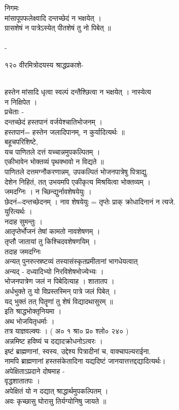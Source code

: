 \documentclass[11pt, openany]{book}
\begin{document}
{{{{{{{निगमः\\
मांसापूपफलेक्ष्वादि दन्तच्छेदं न भक्षयेत् ।\\
ग्रासशेषं न पात्रेऽस्येत् पीतशेषं तु नो पिबेत् ॥\\
~\\
-

{१२० }{ वीरमित्रोदयस्य श्राद्धप्रकाशे-}{\\
हस्तेन मांसादि धृत्वा स्वल्पं दन्तैश्छित्वा न भक्षयेत् । नास्येत्य\\
न निक्षिपेत ।\\
प्रचेताः -\\
दन्तच्छेदं हस्तपानं वर्जयेश्चातिभोजनम् ।\\
हस्तपानं= हस्तेन जलादिपानम्, न कुर्यादित्यर्थः ॥\\
बहूचपरिशिष्टे,\\
यच पाणितले दत्तं यच्चान्नमुपकल्पितम् ।\\
एकीभावेन भोक्तव्यं पृथक्भावो न विद्यते ॥\\
पाणितले दत्तमग्नौकरणान्नम्, उपकल्पितं भोजनपात्रेषु पित्राद्यु.\\
देशेन निहितं, तत् उभयमपि एकीकृत्य मिश्रयित्वा भोक्तव्यम् ।\\
जमदग्निः । न च्छिन्द्युर्नावशेषयेयुः ।\\
छेदनं=दन्तच्छेदनम् । नाव शेषयेयुः = तृप्तेः प्राक् क्रोधादिनानं न
त्यजे.\\
युरित्यर्थः ।\\
नदाह सुमन्तुः ।\\
आतृप्तेर्भोजनं तेषां कामतो नावशेषणम् ।\\
तृप्तौ जातायां तु किश्चिदवशेषणयिम् ।\\
तदाह जमदग्निः \textbar{}\\
अन्यत् पुनरुत्स्रष्टव्यं तस्यासंस्कृतप्रमीतानां भागधेयत्वात्\\
अन्यद् - दध्यादिभ्यो निरविशेषभोज्येभ्यः ।\\
भोजनपात्रेण जलं न पिबेदित्याह । शातातप ।\\
अर्धभुक्ते तु यो विप्रस्तस्मिन् पात्रे जलं पिबेत् ।\\
यद् भुक्तं तत् पितॄणां तु शेषं विद्यादथासुरम् ॥\\
इति श्राद्धभोक्तृनियमा ।\\
अथ भोजयितृधर्माः ।\\
तत्र याज्ञवल्क्यः । ( अ० १ श्रा० प्र० श्लो० २४० )\\
अन्नमिष्ट हविष्यं च दद्यादक्रोधनोऽत्वरः ।\\
इष्टं ब्राह्मणानां, स्वस्य, उद्देश्य पित्रादीनां च, वाक्चापल्यराईना.\\
नामपि ब्राह्मणानां हस्तसंकेतादिना यद्यदिष्टं
जानयात्तत्तद्दद्यादित्यर्थः।\\
अपेक्षिताऽप्रदाने दोषमाह -\\
वृद्धशातातपः ।\\
अपेक्षितं यो न दद्यात् श्राद्धार्थमुपकल्पितम् ।\\
अवः कृच्छासु घोरासु तिर्यग्योनिषु जायते ॥

}}}}}}}}
\end{document}
